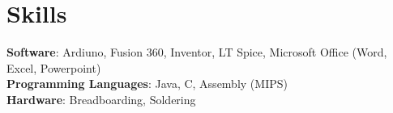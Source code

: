 \section{Skills}
 \begin{itemize}[leftmargin=0.15in, label={}]
    \small{\item{
     \textbf{Software}{: Ardiuno, Fusion 360, Inventor, LT Spice, Microsoft Office (Word, Excel, Powerpoint)} \\
     \textbf{Programming Languages}{: Java, C, Assembly (MIPS)} \\
     \textbf{Hardware}{: Breadboarding, Soldering}
    }}
 \end{itemize}
